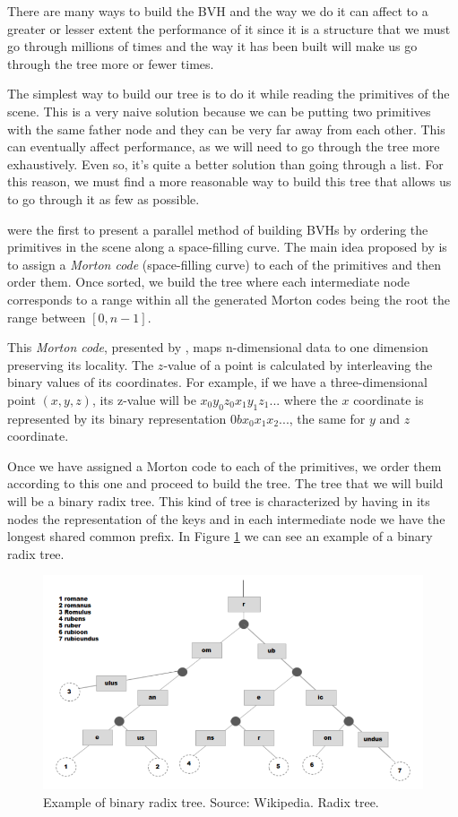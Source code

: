 \documentclass[titlepage,12pt]{report}
\begin{document}
There are many ways to build the BVH and the way we do it can affect to a greater or lesser extent the performance of it since it is a structure that we must go through millions of times and the way it has been built will make us go through the tree more or fewer times.

The simplest way to build our tree is to do it while reading the primitives of the scene.  This is a very naive solution because we can be putting two primitives with the same father node and they can be very far away from each other. This can eventually affect performance, as we will need to go through the tree more exhaustively. Even so, it's quite a better solution than going through a list. For this reason, we must find a more reasonable way to build this tree that allows us to go through it as few as possible.

\citep[p.~375--384]{Lauterbach2009} were the first to present a parallel method of building BVHs by ordering the primitives in the scene along a space-filling curve. The main idea proposed by \citep[p.~375--384]{Lauterbach2009} is to assign a \textit{Morton code} (space-filling curve) to each of the primitives and then order them. Once sorted, we build the tree where each intermediate node corresponds to a range within all the generated Morton codes being the root the range between $[0, n-1]$.

This \textit{Morton code}, presented by \citep{Morton1966ACO}, maps n-dimensional data to one dimension preserving its locality. The $z$-value of a point is calculated by interleaving the binary values of its coordinates. For example, if we have a three-dimensional point $(x,y,z)$, its z-value will be $x_0y_0z_0x_1y_1z_1...$ where the $x$ coordinate is represented by its binary representation $0bx_0x_1x_2...$, the same for $y$ and $z$ coordinate.

Once we have assigned a Morton code to each of the primitives, we order them according to this one and proceed to build the tree. The tree that we will build will be a binary radix tree. This kind of tree is characterized by having in its nodes the representation of the keys and in each intermediate node we have the longest shared common prefix. In Figure \ref{radix} we can see an example of a binary radix tree.

\begin{figure}[H]
	\centering
	\includegraphics[scale=0.45]{media/radixtree.png}
	\caption{Example of binary radix tree. Source: Wikipedia. Radix tree.}
	\label{radix}
\end{figure}
\end{document}
